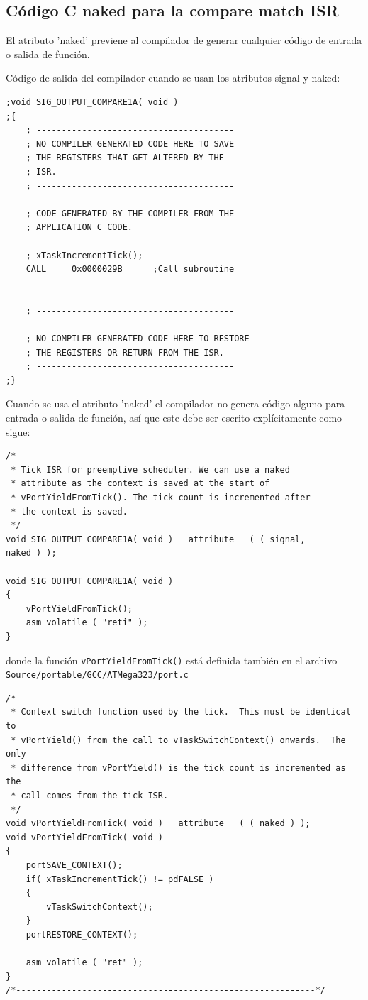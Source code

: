 \documentclass[12pt]{article}
\begin{document}
\subsection*{Código C naked para la compare match ISR}
El atributo 'naked' previene al compilador de generar cualquier código 
de entrada o salida de función.

Código de salida del compilador cuando se usan los atributos signal y 
naked:
\begin{verbatim}
;void SIG_OUTPUT_COMPARE1A( void )
;{
    ; ---------------------------------------
    ; NO COMPILER GENERATED CODE HERE TO SAVE
    ; THE REGISTERS THAT GET ALTERED BY THE
    ; ISR.
    ; ---------------------------------------
    
    ; CODE GENERATED BY THE COMPILER FROM THE
    ; APPLICATION C CODE.
    
    ; xTaskIncrementTick();
    CALL     0x0000029B      ;Call subroutine
    
    
    ; ---------------------------------------
    
    ; NO COMPILER GENERATED CODE HERE TO RESTORE
    ; THE REGISTERS OR RETURN FROM THE ISR.
    ; ---------------------------------------
;}
\end{verbatim}
Cuando se usa el atributo 'naked' el compilador no genera código alguno 
para entrada o salida de función, así que este debe ser escrito 
explícitamente como sigue:
\begin{verbatim}
/*
 * Tick ISR for preemptive scheduler. We can use a naked 
 * attribute as the context is saved at the start of 
 * vPortYieldFromTick(). The tick count is incremented after 
 * the context is saved.
 */
void SIG_OUTPUT_COMPARE1A( void ) __attribute__ ( ( signal, 
naked ) );

void SIG_OUTPUT_COMPARE1A( void )
{
    vPortYieldFromTick();
    asm volatile ( "reti" );
}
\end{verbatim}
donde la función {\tt vPortYieldFromTick()} está definida también en el 
archivo {\tt Source/portable/GCC/ATMega323/port.c}
\begin{verbatim}
/*
 * Context switch function used by the tick.  This must be identical to 
 * vPortYield() from the call to vTaskSwitchContext() onwards.  The only
 * difference from vPortYield() is the tick count is incremented as the
 * call comes from the tick ISR.
 */
void vPortYieldFromTick( void ) __attribute__ ( ( naked ) );
void vPortYieldFromTick( void )
{
    portSAVE_CONTEXT();
    if( xTaskIncrementTick() != pdFALSE )
    {
        vTaskSwitchContext();
    }
    portRESTORE_CONTEXT();

    asm volatile ( "ret" );
}
/*-----------------------------------------------------------*/
\end{verbatim}
\end{document}
